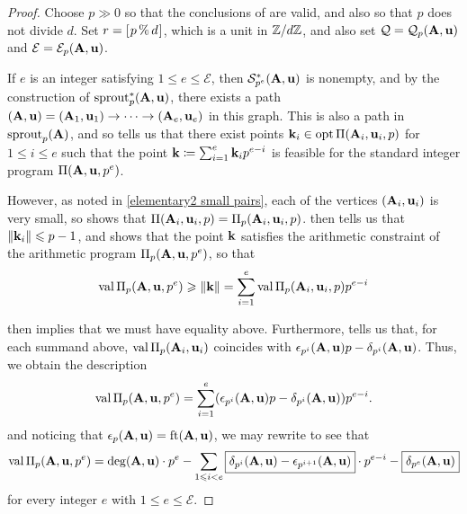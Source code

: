 \documentclass{amsart}
\begin{document}

\begin{proof}
   Choose $p \gg 0$ so that the conclusions of  are valid, and also so that $p$ does not divide $d$.  Set $r = [ \hspace{.01in} p \, \% \, d \hspace{.01in} ]$, which is a unit in $\mathbb{Z}/d\mathbb{Z}$, and also set $\mathcal{Q} = \mathcal{Q}_p(\mathbf{A},\mathbf{u})$ and $\mathcal{E} = \mathcal{E}_p(\mathbf{A}, \mathbf{u})$.  
   
   If $e$ is an integer satisfying $1 \leq e \leq \mathcal{E}$, then $\mathcal{S}_{p^e}^{\ast}(\mathbf{A},\mathbf{u})$ is nonempty, and by the construction of $\operatorname{sprout}_p^{\ast}(\mathbf{A},\mathbf{u})$, there exists a path $(\mathbf{A},\mathbf{u}) = (\mathbf{A}_1, \mathbf{u}_1) \to \cdots \to (\mathbf{A}_e, \mathbf{u}_e)$ in this graph.
   This is also a path in $\operatorname{sprout}_p(\mathbf{A})$, and so  tells us that there exist points $\mathbf{k}_i \in \operatorname{opt} \Pi(\mathbf{A}_i, \mathbf{u}_i, p)$ for $1 \le i \le e$ such that the point $\mathbf{k} \coloneqq \sum_{i=1}^e \mathbf{k}_i p^{e-i}$ is feasible for the standard integer program $\Pi(\mathbf{A}, \mathbf{u}, p^e)$.

   However, as noted in \eqref{elementary2 small pairs}, each of the vertices $(\mathbf{A}_i, \mathbf{u}_i)$ is very small, so  shows that $\Pi(\mathbf{A}_i,\mathbf{u}_i,p) = \Pi_p(\mathbf{A}_i, \mathbf{u}_i, p)$.
    then tells us that $\| \mathbf{k}_i \| \leqslant p - 1$, and  shows that the point $\mathbf{k}$ satisfies the arithmetic constraint of the arithmetic program $\Pi_p(\mathbf{A},\mathbf{u},p^e)$, so that
   \[
	\operatorname{val} \Pi_p(\mathbf{A},\mathbf{u},p^e) \geqslant  \| \mathbf{k} \| = \sum_{i=1}^e \operatorname{val} \Pi_p(\mathbf{A}_i,\mathbf{u}_i,p) p^{e-i}
	\]
   
    then implies that we must have equality above.  Furthermore,  tells us that, for each summand above,  $\operatorname{val} \Pi_p(\mathbf{A}_i, \mathbf{u}_i)$ coincides with $\epsilon_{p^i}(\mathbf{A},\mathbf{u})p - \delta_{p^i}(\mathbf{A},\mathbf{u})$.  Thus, we obtain the description
   \begin{equation}
   \label{value-for-e-at-most-curly-E: q}
     \operatorname{val} \Pi_p(\mathbf{A},\mathbf{u},p^e) = \sum_{i=1}^e (\epsilon_{p^i}(\mathbf{A},\mathbf{u})p - \delta_{p^i}(\mathbf{A},\mathbf{u})) p^{e-i}.
   \end{equation}
 and noticing that $\epsilon_p(\mathbf{A},\mathbf{u}) = \operatorname{ft}(\mathbf{A}, \mathbf{u})$, we may rewrite to see that
\[
     \operatorname{val} \Pi_p(\mathbf{A},\mathbf{u},p^e) = \deg(\mathbf{A}, \mathbf{u}) \cdot p^e - \sum_{1 \leqslant i < e} \boxed{\delta_{p^i}(\mathbf{A}, \mathbf{u}) - \epsilon_{p^{i+1}}(\mathbf{A}, \mathbf{u})} \cdot p^{e-i} - \boxed{\delta_{p^e}(\mathbf{A}, \mathbf{u})}
\]
   for every integer $e$ with $1 \leq e \leq \mathcal{E}$.  
   

\end{proof}
\end{document}
